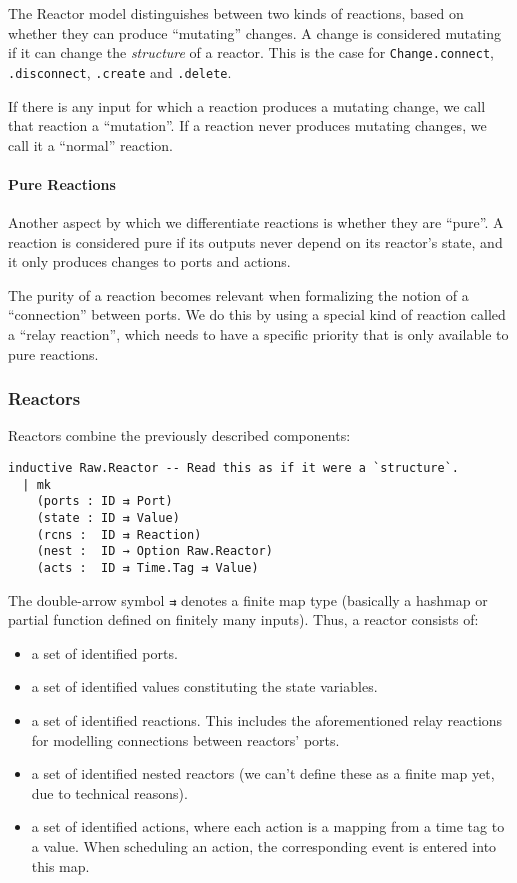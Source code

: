 The Reactor model distinguishes between two kinds of reactions, based on whether they can produce ``mutating'' changes.
A change is considered mutating if it can change the \emph{structure} of a reactor.
This is the case for \lstinline{Change.connect}, \lstinline{.disconnect}, \lstinline{.create} and \lstinline{.delete}.

If there is any input for which a reaction produces a mutating change, we call that reaction a ``mutation''.
If a reaction never produces mutating changes, we call it a ``normal'' reaction.

\paragraph{Pure Reactions}

Another aspect by which we differentiate reactions is whether they are ``pure''.
A reaction is considered pure if its outputs never depend on its reactor's state, and it only produces changes to ports and actions.

The purity of a reaction becomes relevant when formalizing the notion of a ``connection'' between ports.
We do this by using a special kind of reaction called a ``relay reaction'', which needs to have a specific priority that is only available to pure reactions. 

\subsubsection{Reactors}

Reactors combine the previously described components:

\begin{lstlisting}
inductive Raw.Reactor -- Read this as if it were a `structure`.
  | mk 
    (ports : ID ⇉ Port)
    (state : ID ⇉ Value)
    (rcns :  ID ⇉ Reaction)
    (nest :  ID → Option Raw.Reactor)
    (acts :  ID ⇉ Time.Tag ⇉ Value)
\end{lstlisting}

The double-arrow symbol \lstinline{⇉} denotes a finite map type (basically a hashmap or partial function defined on finitely many inputs).
Thus, a reactor consists of:

\begin{itemize}
    \item a set of identified ports.
    \item a set of identified values constituting the state variables.
    \item a set of identified reactions. 
          This includes the aforementioned relay reactions for modelling connections between reactors' ports.
    \item a set of identified nested reactors (we can't define these as a finite map yet, due to technical reasons).
    \item a set of identified actions, where each action is a mapping from a time tag to a value. 
          When scheduling an action, the corresponding event is entered into this map.
\end{itemize}

